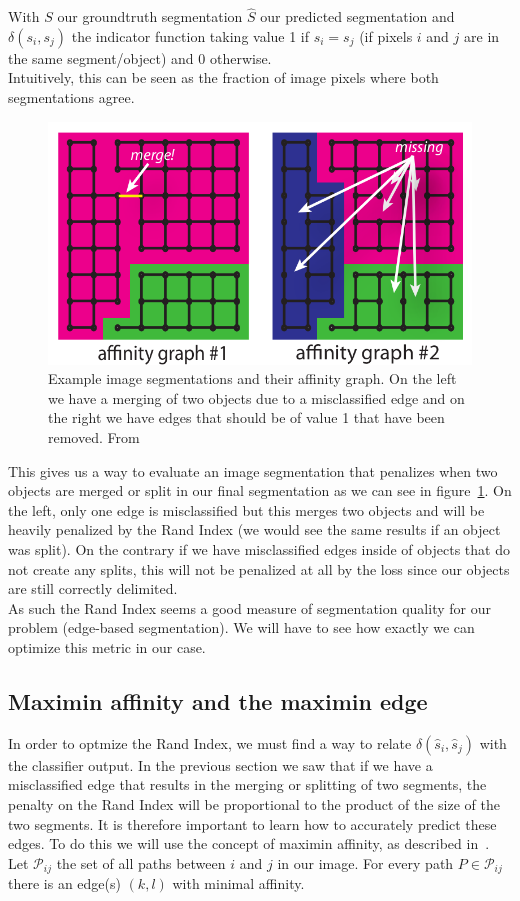 With $S$ our groundtruth segmentation $\hat{S}$ our predicted segmentation and
$\delta(s_i,s_j)$ the indicator function taking value 1 if $s_i = s_j$ (if
pixels $i$ and $j$ are in the same segment/object) and 0 otherwise.\\
Intuitively, this can be seen as the fraction of image pixels where both
segmentations agree.

\begin{figure}[!htbp]
	\centering
	\includegraphics[width=0.45\linewidth]{./images/affinity_graphs.png}
	\caption{Example image segmentations and their affinity graph. On the left
	we have a merging of two objects due to a misclassified edge and on the
right we have edges that should be of value 1 that have been removed. From~\cite{turaga_maximin_2009}}%
	\label{fig:affinity_graphs}
\end{figure}

This gives us a way to evaluate an image segmentation that penalizes when two
objects are merged or split in our final segmentation as we can see in
figure~\ref{fig:affinity_graphs}. On the left, only one edge is misclassified
but this merges two objects and will be heavily penalized by the Rand Index (we
would see the same results if an object was split). On the contrary if we have
misclassified edges inside of objects that do not create any splits, this will
not be penalized at all by the loss since our objects are still correctly
delimited.\\

As such the Rand Index seems a good measure of segmentation quality for our
problem (edge-based segmentation). We will have to see how exactly we can
optimize this metric in our case.

\subsection{Maximin affinity and the maximin edge}

In order to optmize the Rand Index, we must find a way to relate
$\delta(\hat{s}_i,\hat{s}_j)$ with the classifier output.
In the previous section we saw that if we have a misclassified edge that results in the merging or splitting of two segments, the penalty on the Rand Index will be proportional to the product of the size of the two segments. 
It is therefore important to learn how to accurately predict these edges.
To do this we will use the concept of maximin
affinity, as described in~\cite{turaga_maximin_2009}.\\
Let $\mathcal{P}_{ij}$ the set of all paths between $i$ and $j$ in our image.
For every path $P\in\mathcal{P}_{ij}$ there is an edge(s) $(k,l)$ with minimal
affinity.\\

